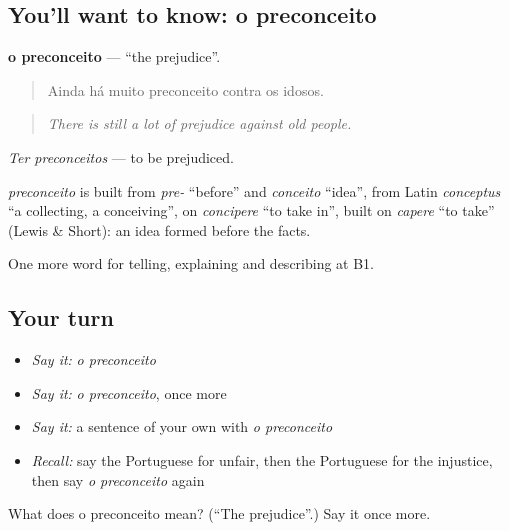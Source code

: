 \subsection*{You'll want to know: o preconceito}
\textbf{o preconceito} — \textquotedblleft{}the prejudice\textquotedblright{}.

\begin{quote}
Ainda há muito preconceito contra os idosos.
\end{quote}

\begin{quote}
\emph{There is still a lot of prejudice against old people.}
\end{quote}

\emph{Ter preconceitos} — to be prejudiced.

\begin{cousinweb}
\emph{preconceito} is built from \emph{pre-} \textquotedblleft{}before\textquotedblright{} and \emph{conceito} \textquotedblleft{}idea\textquotedblright{}, from Latin \emph{conceptus} \textquotedblleft{}a collecting, a conceiving\textquotedblright{}, on \emph{concipere} \textquotedblleft{}to take in\textquotedblright{}, built on \emph{capere} \textquotedblleft{}to take\textquotedblright{} (Lewis \& Short): an idea formed before the facts.
\end{cousinweb}

\begin{grammarlens}[title={What you've built}]
One more word for telling, explaining and describing at B1.
\end{grammarlens}

\subsection*{Your turn}
\begin{itemize}
\raggedright
  \item \emph{Say it:} \emph{o preconceito}
  \item \emph{Say it:} \emph{o preconceito}, once more
  \item \emph{Say it:} a sentence of your own with \emph{o preconceito}
  \item \emph{Recall:} say the Portuguese for unfair, then the Portuguese for the injustice, then say \emph{o preconceito} again
\end{itemize}

\begin{tcolorbox}[breakable,colback=teal!4,colframe=teal!35!black,title={Before you move on}]
What does o preconceito mean? (\textquotedblleft{}The prejudice\textquotedblright{}.) Say it once more.
\end{tcolorbox}
